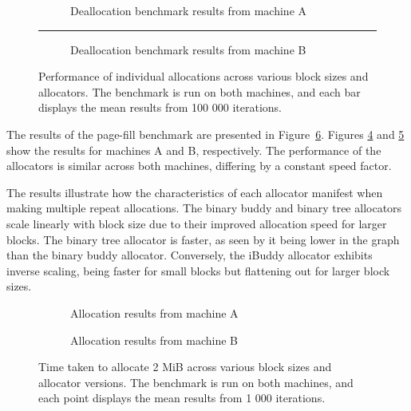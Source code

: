\begin{figure}[h]
    \centering
    \begin{subfigure}{\textwidth}
        \centering
        \captionsetup{justification=centering}
        
        \caption{Deallocation benchmark results from machine A}
        \label{fig:deallocA}
    \end{subfigure}
    \rule{\textwidth}{0.1pt}
    \begin{subfigure}{\textwidth}
        \centering
        \captionsetup{justification=centering}
        
        \caption{Deallocation benchmark results from machine B}
        \label{fig:deallocB}
    \end{subfigure}
    \caption{Performance of individual allocations across various block sizes and allocators. The benchmark is run on both machines, and each bar displays the mean results from 100 000 iterations.}
    \label{fig:deallocbenchmark}
\end{figure}
\FloatBarrier

\newpage
The results of the page-fill benchmark are presented in Figure~\ref{fig:allocpage}. Figures \ref{fig:allocpageA} and \ref{fig:allocpageB} show the results for machines A and B, respectively. The performance of the allocators is similar across both machines, differing by a constant speed factor.

The results illustrate how the characteristics of each allocator manifest when making multiple repeat allocations. The binary buddy and binary tree allocators scale linearly with block size due to their improved allocation speed for larger blocks. The binary tree allocator is faster, as seen by it being lower in the graph than the binary buddy allocator. Conversely, the iBuddy allocator exhibits inverse scaling, being faster for small blocks but flattening out for larger block sizes.

\begin{figure}[h]
    \centering
    \begin{subfigure}{0.495\textwidth}
        \centering
        \captionsetup{justification=centering}
        
        \caption{Allocation results from machine A}
        \label{fig:allocpageA}
    \end{subfigure}
    \begin{subfigure}{0.495\textwidth}
        \centering
        \captionsetup{justification=centering}
        
        \caption{Allocation results from machine B}
        \label{fig:allocpageB}
    \end{subfigure}
    \caption{Time taken to allocate 2 MiB across various block sizes and allocator versions. The benchmark is run on both machines, and each point displays the mean results from 1 000 iterations.}
    \label{fig:allocpage}
\end{figure}

